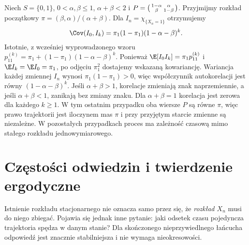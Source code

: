 \begin{przyklad}
Niech $S=\{0,1\}$, $0<\alpha,\beta\leq1$,
$\alpha+\beta<2$ i
$P=\begin{psmallmatrix}1-\alpha&\alpha\\
\beta&1-\beta\end{psmallmatrix}$.
Przyjmijmy rozkład początkowy
$\pi=(\beta,\alpha)/(\alpha+\beta)$.
Dla $I_n=\chi_{\{X_n=1\}}$ otrzymujemy
\[
\Cov(I_0,I_k)=\pi_1(1-\pi_1)(1-\alpha-\beta)^k.
\]
Istotnie, z wcześniej wyprowadzonego wzoru
$p_{11}^{(k)}=\pi_1+(1-\pi_1)(1-\alpha-\beta)^k$.
Ponieważ $\E[I_0 I_k]=\pi_1p_{11}^{(k)}$ i
$\E I_k=\E I_0=\pi_1$, po odjęciu $\pi_1^2$
dostajemy wskazaną kowariancję. Wariancja
każdej zmiennej $I_n$ wynosi $\pi_1(1-\pi_1)>0$,
więc współczynnik autokorelacji jest równy
$(1-\alpha-\beta)^k$.
Jeśli $\alpha+\beta>1$, korelacje zmieniają
znak naprzemiennie, a jeśli $\alpha+\beta<1$,
zanikają bez zmiany znaku. Dla $\alpha+\beta=1$
korelacja jest zerowa dla każdego $k\geq1$. W tym ostatnim przypadku oba wiersze $P$
są równe $\pi$, więc prawo trajektorii jest
iloczynem mas $\pi$ i przy przyjętym starcie
zmienne są niezależne. W pozostałych przypadkach
proces ma zależność czasową mimo stałego
rozkładu jednowymiarowego.
\end{przyklad}

\section{Częstości odwiedzin i twierdzenie ergodyczne}

Istnienie rozkładu stacjonarnego nie oznacza samo
przez się, że \emph{rozkład $X_n$} musi do niego
zbiegać. Pojawia się jednak inne pytanie:
jaki odsetek czasu pojedyncza trajektoria
spędza w danym stanie? Dla skończonego
nieprzywiedlnego łańcucha odpowiedź jest
znacznie stabilniejsza i nie wymaga nieokresowości.

